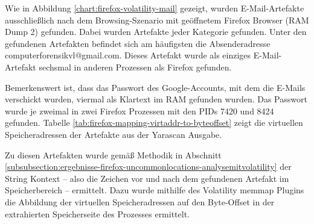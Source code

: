 Wie in Abbildung \ref{chart:firefox-volatility-mail} gezeigt, wurden E-Mail-Artefakte ausschließlich nach dem Browsing-Szenario mit geöffnetem Firefox Browser (RAM Dump 2) gefunden. Dabei wurden Artefakte jeder Kategorie gefunden.
Unter den gefundenen Artefakten befindet sich am häufigsten die Absenderadresse \glqq{}computerforensikvl@gmail.com\grqq{}. Dieses Artefakt wurde als einziges E-Mail-Artefakt sechsmal in anderen Prozessen als Firefox gefunden.

Bemerkenswert ist, dass das Passwort des Google-Accounts, mit dem die E-Mails verschickt wurden, viermal als Klartext im RAM gefunden wurden. Das Passwort wurde je zweimal in zwei Firefox Prozessen mit den PIDs 7420 und 8424 gefunden. Tabelle \ref{tab:firefox-mapping-virtaddr-to-byteoffset} zeigt die virtuellen Speicheradressen der Artefakte aus der Yarascan Ausgabe.
\begin{table}[h!]
\caption{Firefox: Abbildung der virtellen Speicheradressen der gefundenen Strings auf Byte-Offsets der entsprechenden Speicherseiten}
\label{tab:firefox-mapping-virtaddr-to-byteoffset}
\end{table}

Zu diesen Artefakten wurde gemäß Methodik in Abschnitt \ref{subsubsection:ergebnisse-firefox-uncommonlocations-analysemitvolatility} der String Kontext -- also die Zeichen vor und nach dem gefundenen Artefakt im Speicherbereich -- ermittelt. Dazu wurde mithilfe des Volatility memmap Plugins die Abbildung der virtuellen Speicheradressen auf den Byte-Offset in der extrahierten Speicherseite des Prozesses ermittelt. 

